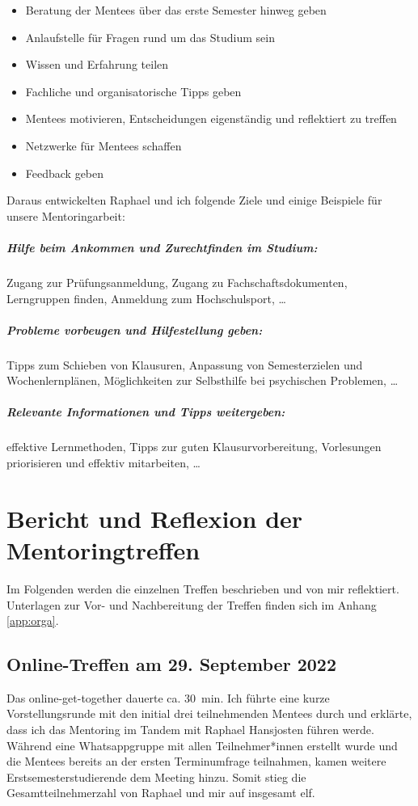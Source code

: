 \documentclass[
    paper=a4,
    div=calc,
    numbers=noendperiod,
]{scrartcl}
\begin{document}
    \begin{itemize}[noitemsep]
        \item Beratung der Mentees über das erste Semester hinweg geben
        \item Anlaufstelle für Fragen rund um das Studium sein
        \item Wissen und Erfahrung teilen
        \item Fachliche und organisatorische Tipps geben
        \item Mentees motivieren, Entscheidungen eigenständig und reflektiert zu treffen
        \item Netzwerke für Mentees schaffen
        \item Feedback geben
    \end{itemize}

    Daraus entwickelten Raphael und ich folgende Ziele und einige Beispiele für unsere Mentoringarbeit:

    \subparagraph{Hilfe beim Ankommen und Zurechtfinden im Studium:}
        Zugang zur Prüfungsanmeldung, Zugang zu Fachschaftsdokumenten, Lerngruppen finden, Anmeldung zum Hochschulsport, \dots

    \subparagraph{Probleme vorbeugen und Hilfestellung geben:}
        Tipps zum Schieben von Klausuren, Anpassung von Semesterzielen und Wochenlernplänen, Möglichkeiten zur Selbsthilfe bei psychischen Problemen, \dots

    \subparagraph{Relevante Informationen und Tipps weitergeben:}
        effektive Lernmethoden, Tipps zur guten Klausurvorbereitung, Vorlesungen priorisieren und effektiv mitarbeiten, \dots

\section{Bericht und Reflexion der Mentoringtreffen}
    Im Folgenden werden die einzelnen Treffen beschrieben und von mir reflektiert. Unterlagen zur Vor- und Nachbereitung der Treffen finden sich im Anhang \ref{app:orga}. 

    \subsection{Online-Treffen am 29. September 2022}
        Das online-get-together dauerte ca. \SI{30}{\minute}. Ich führte eine kurze Vorstellungsrunde mit den initial drei teilnehmenden Mentees durch und erklärte, dass ich das Mentoring im Tandem mit Raphael Hansjosten führen werde. Während eine Whatsappgruppe mit allen Teilnehmer*innen erstellt wurde und die Mentees bereits an der ersten Terminumfrage teilnahmen, kamen weitere Erstsemesterstudierende dem Meeting hinzu. Somit stieg die Gesamtteilnehmerzahl von Raphael und mir auf insgesamt elf.
\end{document}
